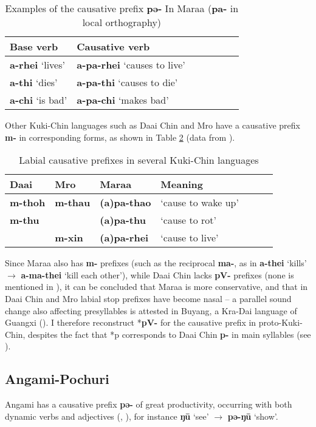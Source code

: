 \documentclass[oneside,a4paper,11pt]{article}
\newcommand{\ipa}[1]{\textbf{{\phon\mbox{#1}}}} %
\newcommand{\forme}[2]{\ipa{#1} `#2'}
\begin{document}
\begin{table}[H]
\caption{Examples of the causative prefix \ipa{pə-} In Maraa (\ipa{pa-} in local orthography)} \centering \label{tab:maraa}
\begin{tabular}{lllllll}
\toprule
Base verb & Causative verb \\
\midrule
\forme{a-rhei}{lives} & \forme{a-pa-rhei}{causes to live} \\
\forme{a-thi}{dies} & \forme{a-pa-thi}{causes to die} \\
\forme{a-chi}{is bad} & \forme{a-pa-chi}{makes bad} \\
\bottomrule
\end{tabular}
\end{table}

Other Kuki-Chin languages such as Daai Chin and Mro have a causative prefix \ipa{m-} in corresponding forms, as shown in Table \ref{tab:kukichin}  (data from \citealt[139]{hartmann01prenasalization}).

\begin{table}[H]
\caption{Labial causative prefixes in several Kuki-Chin languages} \centering \label{tab:kukichin}
\begin{tabular}{lllllll}
\toprule
Daai & Mro & Maraa & Meaning \\
\midrule
\ipa{m-thoh}  &\ipa{m-thau}  & \ipa{(a)pa-thao} & `cause to wake up' \\
\ipa{m-thu}  &  & \ipa{(a)pa-thu} & `cause to rot' \\
&\ipa{m-xin}  & \ipa{(a)pa-rhei} & `cause to live' \\
\bottomrule
\end{tabular}
\end{table}

Since Maraa also has \ipa{m-} prefixes (such as the reciprocal \ipa{ma-}, as in \forme{a-thei}{kills} $\rightarrow$ \forme{a-ma-thei}{kill each other}), while Daai Chin lacks \ipa{pV-} prefixes (none is mentioned in \citealt{hartmann09grammar}), it can be concluded that Maraa is more conservative, and that in Daai Chin and Mro labial stop prefixes have become nasal -- a parallel sound change also affecting presyllables is attested in Buyang, a Kra-Dai language of Guangxi (\citealt{jacques17buyang}). I therefore reconstruct *\ipa{pV-} for the causative prefix in proto-Kuki-Chin, despites the fact that *p corresponds to Daai Chin \ipa{p-} in main syllables (see \citealt[84]{vanbik09pkc}).

\subsection{Angami-Pochuri}
Angami has a causative prefix \ipa{pə-} of great productivity, occurring with both dynamic verbs and adjectives (\citealt[132-3]{matisoff03}, \citealt[66-67]{giridhar80angami}), for instance \forme{ŋū}{see} $\rightarrow$ \forme{pə-ŋū}{show}.
\end{document}
